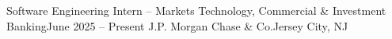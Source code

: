 \resumeSubheading
{Software Engineering Intern – Markets Technology, Commercial \& Investment Banking}{June 2025 – Present}
{J.P. Morgan Chase \& Co.}{Jersey City, NJ}
\resumeItemListStart
\vspace{1mm} 
\resumeItemListEnd

